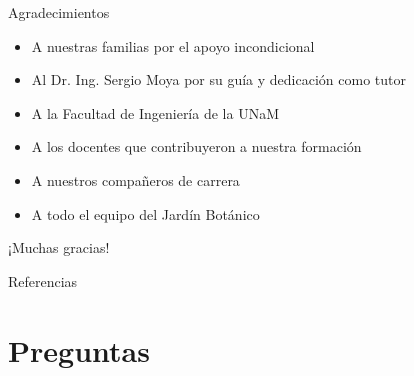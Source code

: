 \documentclass[10pt]{beamer}
\begin{document}
\begin{frame}{Agradecimientos}
\begin{itemize}
\item A nuestras familias por el apoyo incondicional
\item Al Dr. Ing. Sergio Moya por su guía y dedicación como tutor
\item A la Facultad de Ingeniería de la UNaM
\item A los docentes que contribuyeron a nuestra formación
\item A nuestros compañeros de carrera
\item A todo el equipo del Jardín Botánico
\end{itemize}
\end{frame}

\begin{frame}[standout]
¡Muchas gracias!
\end{frame}

\begin{frame}[allowframebreaks]{Referencias}
\printbibliography[heading=none]
\end{frame}

\section*{Preguntas}

\appendix

        
\end{document}
